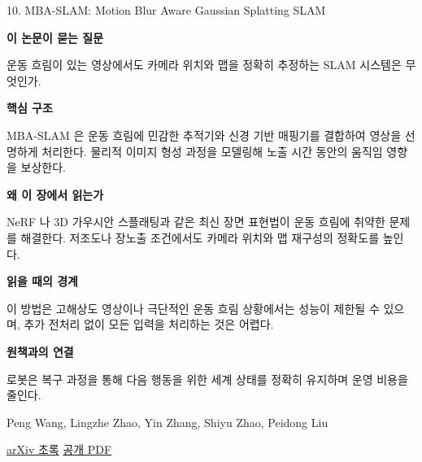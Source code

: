 \documentclass[11pt,openany]{book}
\begin{document}
\begin{termcard}{10. MBA-SLAM: Motion Blur Aware Gaussian Splatting SLAM}

\par

\medskip

{\sffamily\bfseries\color{deepblue} 이 논문이 묻는 질문}\par

운동 흐림이 있는 영상에서도 카메라 위치와 맵을 정확히 추정하는 SLAM 시스템은 무엇인가.

\smallskip

{\sffamily\bfseries\color{deepblue} 핵심 구조}\par

MBA-SLAM 은 운동 흐림에 민감한 추적기와 신경 기반 매핑기를 결합하여 영상을 선명하게 처리한다. 물리적 이미지 형성 과정을 모델링해 노출 시간 동안의 움직임 영향을 보상한다.

\smallskip

{\sffamily\bfseries\color{deepblue} 왜 이 장에서 읽는가}\par

NeRF 나 3D 가우시안 스플래팅과 같은 최신 장면 표현법이 운동 흐림에 취약한 문제를 해결한다. 저조도나 장노출 조건에서도 카메라 위치와 맵 재구성의 정확도를 높인다.

\smallskip

{\sffamily\bfseries\color{coral} 읽을 때의 경계}\par

이 방법은 고해상도 영상이나 극단적인 운동 흐림 상황에서는 성능이 제한될 수 있으며, 추가 전처리 없이 모든 입력을 처리하는 것은 어렵다.

\smallskip

{\sffamily\bfseries\color{teal} 원책과의 연결}\par

로봇은 복구 과정을 통해 다음 행동을 위한 세계 상태를 정확히 유지하며 운영 비용을 줄인다.

\medskip

{\footnotesize\color{muted} Peng Wang, Lingzhe Zhao, Yin Zhang, Shiyu Zhao, Peidong Liu\par

\href{https://arxiv.org/abs/2411.08279}{arXiv 초록} \quad \href{https://arxiv.org/pdf/2411.08279}{공개 PDF}\par}

\end{termcard}
\end{document}
